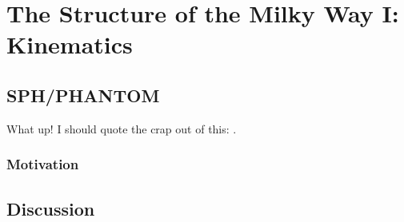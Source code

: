 \chapter{The Structure of the Milky Way I: Kinematics}
\label{ch:chapter1}


\section{SPH/PHANTOM}
What up! I should quote the crap out of this: \citet{2008MNRAS.389.1097D}.
\subsection{Motivation}


\section{Discussion}
